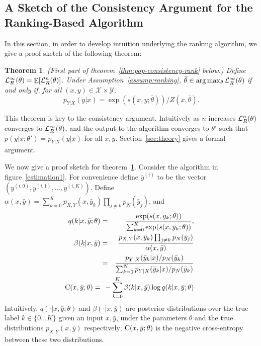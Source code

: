 \documentclass[11pt,a4paper]{article}
\DeclareMathOperator{\E}{\mathbb{E}}
\newcommand{\objr}{{\cal L}_R^n}
\newcommand{\objri}{{\cal L}_R^{\infty}}
\newcommand{\str}[3]{s(#1, #2; #3)}
\newcommand{\ssf}[3]{\bar{s}(#1, #2; #3)}
\newtheorem{theorem}{Theorem}[section]
\newcommand{\commentout}[1]{}
\begin{document}
\subsection{A Sketch of the Consistency Argument for the Ranking-Based Algorithm}
\label{sec:overview}

\newcommand{\ce}{\hbox{C}}

\newcommand{\bary}{\bar{y}}

In this section, in order to develop intuition underlying the ranking
algorithm, we give a proof sketch of the following theorem:
\begin{theorem} (First part of theorem~\ref{thm:pop-consistency-rank} below.)
Define $\objri(\theta) = \E[ \objr(\theta)]$.
Under Assumption~\ref{assump:ranking}, $\bar{\theta}\in \arg\max_\theta \objri(\theta)$ if and only if, for all $ (x, y)\in\mathcal{X} \times \mathcal{Y}$,
$$
p_{Y|X}(y|x) = \exp(\str{x}{y}{\bar{\theta}})/Z(x, \bar{\theta} ).
$$
\label{th:fp}
\end{theorem}
\vspace{-0.5cm}
This theorem is key to the consistency argument.
Intuitively as $n$ increases $\objr(\theta)$ converges to
$\objri(\theta)$, and the output to the algorithm converges to
$\theta'$ such that $p(y | x; \theta') = p_{Y|X}(y | x)$ for all $x,
y$. Section~\ref{sec:theory} gives a formal argument.


\commentout{
The input to the algorithm is a set $\{x^{(i)},
y^{(i)}\}$ for $i = 1 \ldots n$ drawn from the distribution $p(x, y)$.
In addition for each training example we sample $K$ ``negative''
examples $y^{(i,k)}$ for $k = 1 \ldots K$.}

We now give a proof sketch for theorem~\ref{th:fp}.
Consider the algorithm in figure~\ref{estimation1}.
For convenience define
$\bar{y}^{(i)}$ to be the vector $(y^{(i,0)}, y^{(i,1)}, \ldots, y^{(i, K)})$.
Define 
$\alpha(x, \bary) = \sum_{k=0}^K p_{X,Y}(x, \bary_k) \prod_{j \neq k} p_N(\bary_j)$,
and
\begin{eqnarray*}
 q(k | x, \bary; \theta) &=&
\frac{ \exp ( \ssf{x}{\bary_k}{\theta} ) }
{
\sum_{k=0}^K \exp (
  \ssf{x}{\bary_k}{\theta} ) },\\
\beta(k | x, \bary) &=&
\frac{p_{X, Y}(x, \bary_k) \prod_{j \neq k} p_N(\bary_j)}
{\alpha(x, \bary)}
\\
&=& \frac{p_{Y|X}(\bary_k| x)/p_N(\bary_k)}{\sum_{k=0}^N p_{Y|X}(\bary_k|x)/p_N(\bary_k)}\\
\hbox{$\;$\hspace{-1.7cm}$\;$}
\ce(x, \bary; \theta) = 
&&
\hbox{$\;$\hspace{-1cm}$\;$}
- \sum_{k=0}^K \beta(k | x, \bary) \log q(k | x, \bary; \theta)
\end{eqnarray*}
Intuitively, $q(\cdot|x, \bary; \theta)$ and $\beta(\cdot|x, \bary)$ are posterior
distributions over the true label $k \in \{0 \ldots K\}$ given an input $x, \bary$,
under the parameters $\theta$ and the true distributions $p_{X, \bar{Y}}(x, \bary)$
respectively; $\ce(x, \bary; \theta)$ is the negative cross-entropy
between these two distributions.
\end{document}
